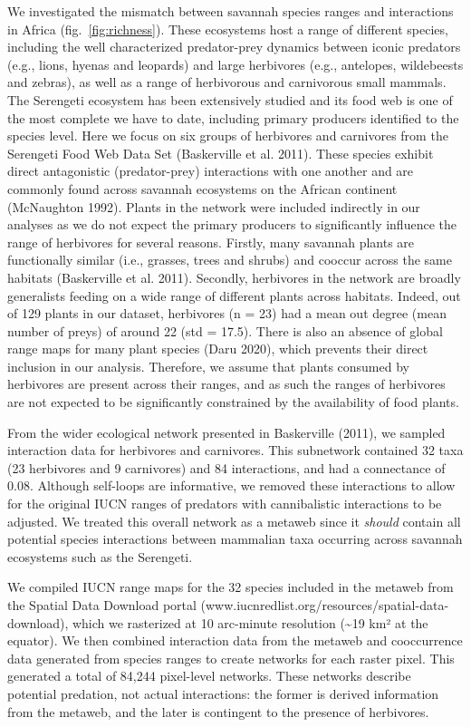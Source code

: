 \documentclass[10pt,oneside]{article}
\begin{document}
We investigated the mismatch between savannah species ranges and
interactions in Africa (fig.~\ref{fig:richness}). These ecosystems host
a range of different species, including the well characterized
predator-prey dynamics between iconic predators (e.g., lions, hyenas and
leopards) and large herbivores (e.g., antelopes, wildebeests and
zebras), as well as a range of herbivorous and carnivorous small
mammals. The Serengeti ecosystem has been extensively studied and its
food web is one of the most complete we have to date, including primary
producers identified to the species level. Here we focus on six groups
of herbivores and carnivores from the Serengeti Food Web Data Set
(Baskerville et al. 2011). These species exhibit direct antagonistic
(predator-prey) interactions with one another and are commonly found
across savannah ecosystems on the African continent (McNaughton 1992).
Plants in the network were included indirectly in our analyses as we do
not expect the primary producers to significantly influence the range of
herbivores for several reasons. Firstly, many savannah plants are
functionally similar (i.e., grasses, trees and shrubs) and cooccur
across the same habitats (Baskerville et al. 2011). Secondly, herbivores
in the network are broadly generalists feeding on a wide range of
different plants across habitats. Indeed, out of 129 plants in our
dataset, herbivores (n = 23) had a mean out degree (mean number of
preys) of around 22 (std = 17.5). There is also an absence of global
range maps for many plant species (Daru 2020), which prevents their
direct inclusion in our analysis. Therefore, we assume that plants
consumed by herbivores are present across their ranges, and as such the
ranges of herbivores are not expected to be significantly constrained by
the availability of food plants.

From the wider ecological network presented in Baskerville (2011), we
sampled interaction data for herbivores and carnivores. This subnetwork
contained 32 taxa (23 herbivores and 9 carnivores) and 84 interactions,
and had a connectance of 0.08. Although self-loops are informative, we
removed these interactions to allow for the original IUCN ranges of
predators with cannibalistic interactions to be adjusted. We treated
this overall network as a metaweb since it \emph{should} contain all
potential species interactions between mammalian taxa occurring across
savannah ecosystems such as the Serengeti.

We compiled IUCN range maps for the 32 species included in the metaweb
from the Spatial Data Download portal
(www.iucnredlist.org/resources/spatial-data-download), which we
rasterized at 10 arc-minute resolution (\textasciitilde19 km² at the
equator). We then combined interaction data from the metaweb and
cooccurrence data generated from species ranges to create networks for
each raster pixel. This generated a total of 84,244 pixel-level
networks. These networks describe potential predation, not actual
interactions: the former is derived information from the metaweb, and
the later is contingent to the presence of herbivores.
\end{document}
